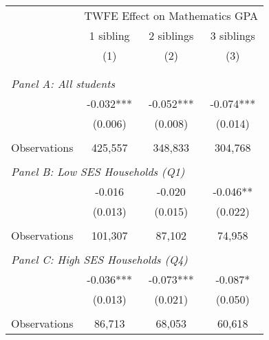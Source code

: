 \makeatletter
{}
{
\makeatother
\begin{tabular}{lccc}
\toprule
\cmidrule(lr){2-4}
& \multicolumn{3}{c}{TWFE Effect on Mathematics GPA} \\
\cmidrule(lr){2-4}
& 1 sibling & 2 siblings & 3 siblings  \\
\cmidrule(lr){2-2} \cmidrule(lr){3-3} \cmidrule(lr){4-4}
& (1) & (2) & (3)\\
\bottomrule
&  &  &  \\
&  &  &   \\
\multicolumn{4}{l}{\textit{Panel A: All students}} \\
\hspace{3mm}        &      -0.032***&      -0.052***&      -0.074***\\
                    &     (0.006)   &     (0.008)   &     (0.014)   \\
                    &               &               &               \\
\hspace{3mm}Observations&     425,557   &     348,833   &     304,768   \\
 
&  &  &   \\
\multicolumn{4}{l}{\textit{Panel B: Low SES Households (Q1)}} \\
\hspace{3mm}        &      -0.016   &      -0.020   &      -0.046** \\
                    &     (0.013)   &     (0.015)   &     (0.022)   \\
                    &               &               &               \\
\hspace{3mm}Observations&     101,307   &      87,102   &      74,958   \\
 
&  &  &   \\
\multicolumn{4}{l}{\textit{Panel C: High SES Households (Q4)}} \\
\hspace{3mm}        &      -0.036***&      -0.073***&      -0.087*  \\
                    &     (0.013)   &     (0.021)   &     (0.050)   \\
                    &               &               &               \\
\hspace{3mm}Observations&      86,713   &      68,053   &      60,618   \\
 

\end{tabular}}
